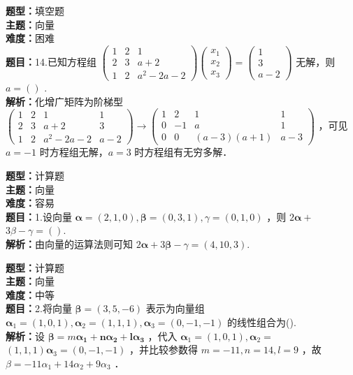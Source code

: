 \documentclass{ctexart}
\newenvironment{question}[5]{%
	\noindent\textbf{题型：}#1\\
	\textbf{主题：}#2\\
	\textbf{难度：}#3\\
	\textbf{题目：}#4\\
	\textbf{解析：}#5\\
	\vspace{1em}
}{}
\begin{document}
	\begin{question}
		{填空题}
		{向量}
		{困难}
		{14.已知方程组 \(\left(\begin{array}{ccc}1 & 2 & 1 \\ 2 & 3 & a+2 \\ 1 & 2 & a^2-2 a-2\end{array}\right)\left(\begin{array}{l}x_1 \\ x_2 \\ x_3\end{array}\right)=\left(\begin{array}{c}1 \\ 3 \\ a-2\end{array}\right)\) 无解，则 \(a=()\) . }
		{化增广矩阵为阶梯型 \(\left(\begin{array}{cccc}1 & 2 & 1 & 1 \\ 2 & 3 & a+2 & 3 \\ 1 & 2 & a^2-2 a-2 & a-2\end{array}\right) \rightarrow\left(\begin{array}{cccc}1 & 2 & 1 & 1 \\ 0 & -1 & a & 1 \\ 0 & 0 & (a-3)(a+1) & a-3\end{array}\right)\) ，可见 \(a=-1\) 时方程组无解，\(a=3\) 时方程组有无穷多解．}
	\end{question}
	
	
	
	\begin{question}
		{计算题}
		{向量}
		{容易}
		{1.设向量 \(\boldsymbol{\alpha}=(2,1,0), \boldsymbol{\beta}=(0,3,1), \gamma=(0,1,0)\) ，则 \(2 \boldsymbol{\alpha}+\) \(3 \beta-\gamma=()\). }
		{由向量的运算法则可知 \(2 \boldsymbol{\alpha}+3 \boldsymbol{\beta}-\gamma=(4,10,3)\). }
	\end{question}
	
	
	
	\begin{question}
		{计算题}
		{向量}
		{中等}
		{2.将向量 \(\boldsymbol{\beta}=(3,5,-6)\) 表示为向量组 \(\boldsymbol{\alpha}_1=(1,0,1), \boldsymbol{\alpha}_2=(1,1,1), \boldsymbol{\alpha}_3=(0,-1,-1)\) 的线性组合为(\qquad). }
		{设 \(\boldsymbol{\beta}=m \boldsymbol{\alpha}_{\mathbf{1}}+\boldsymbol{n} \boldsymbol{\alpha}_{\mathbf{2}}+\boldsymbol{l} \boldsymbol{\alpha}_{\mathbf{3}}\) ，代入 \(\boldsymbol{\alpha}_1=(1,0,1), \boldsymbol{\alpha}_2=\) \((1,1,1) \boldsymbol{\alpha}_3=(0,-1,-1)\) ，并比较参数得 \(m=-11, n=14, l=9\) ，故 \(\beta=-11 \alpha_1+14 \alpha_2+9 \alpha_3\) ．}
	\end{question}
	
\end{document}
